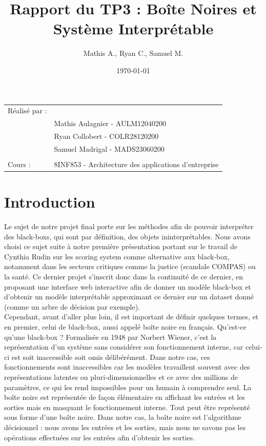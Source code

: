 \documentclass{article}
\title{Rapport du TP3 : Boîte Noires et Système Interprétable}
\author{Mathis A., Ryan C., Samuel M.}
\date{\today}
\begin{document}
\maketitle
\noindent\begin{tabular}{@{}ll}
    Réalisé par :\\
        & Mathis Aulagnier - AULM12040200 \\
        & Ryan Collobert - COLR28120200 \\
        & Samuel Madrigal - MADS23060200 \\
        \\
    Cours :  &  8INF853 - Architecture des applications d'entreprise \\
\end{tabular}

\tableofcontents

\clearpage

\section{Introduction}

\quad Le sujet de notre projet final porte sur les méthodes afin de pouvoir interpréter des black-boxs, qui sont par définition, des objets ininterprétables. Nous avons choisi ce sujet suite à notre première présentation portant sur le travail de Cynthia Rudin sur les scoring system comme alternative aux black-box, notamment dans les secteurs critiques comme la justice (scandale COMPAS) ou la santé. Ce dernier projet s’inscrit donc dans la continuité de ce dernier, en proposant une interface web interactive afin de donner un modèle black-box et d’obtenir un modèle interprétable approximant ce dernier sur un dataset donné (comme un arbre de décision par exemple).\\

Cependant, avant d’aller plus loin, il est important de définir quelques termes, et en premier, celui de black-box, aussi appelé boîte noire en français. Qu’est-ce qu’une black-box ? Formalisée en 1948 par Norbert Wiener, c’est la représentation d'un système sans considérer son fonctionnement interne, car celui-ci est soit inaccessible soit omis délibérément. Dans notre cas, ces fonctionnements sont inaccessibles car les modèles travaillent souvent avec des représentations latentes ou pluri-dimensionnelles et ce avec des millions de paramètres, ce qui les rend impossibles pour un humain à comprendre seul. La boîte noire est représentée de façon élémentaire en affichant les entrées et les sorties mais en masquant le fonctionnement interne. Tout peut être représenté sous forme d'une boîte noire. Dans notre cas, la boîte noire est l’algorithme décisionnel : nous avons les entrées et les sorties, mais nous ne savons pas les opérations effectuées sur les entrées afin d’obtenir les sorties.\\
\end{document}
